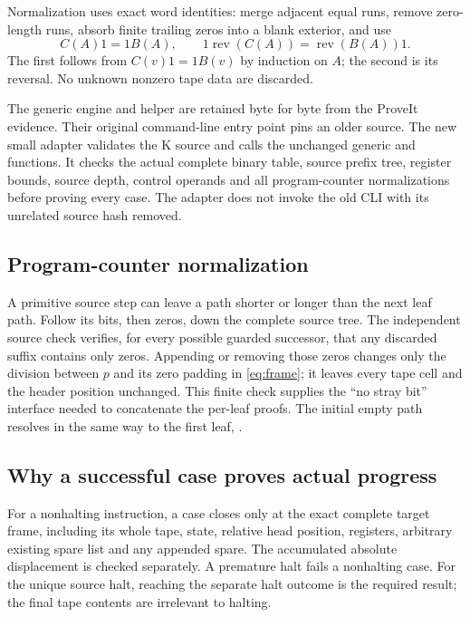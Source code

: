 \documentclass[11pt,a4paper]{article}
\newcommand{\code}[1]{\texttt{\detokenize{#1}}}
\begin{document}
Normalization uses exact word identities: merge adjacent equal runs,
remove zero-length runs, absorb finite trailing zeros into a blank
exterior, and use
\[
 C(A)1=1B(A),\qquad
 1\operatorname{rev}(C(A))=\operatorname{rev}(B(A))1.
\]
The first follows from $C(v)1=1B(v)$ by induction on $A$; the second
is its reversal. No unknown nonzero tape data are discarded.

The generic engine and helper are retained byte for byte from the
ProveIt evidence. Their original command-line entry point pins an older
source. The new small adapter validates the K source and calls the
unchanged generic \code{prove_blocks} and \code{case} functions.
It checks the actual complete binary table, source prefix tree,
register bounds, source depth, control operands and all program-counter
normalizations before proving every case. The adapter does not invoke
the old CLI with its unrelated source hash removed.

\subsection{Program-counter normalization}

A primitive source step can leave a path shorter or longer than the
next leaf path. Follow its bits, then zeros, down the complete source
tree. The independent source check verifies, for every possible
guarded successor, that any discarded suffix contains only zeros.
Appending or removing those zeros changes only the division between
$p$ and its zero padding in \eqref{eq:frame}; it leaves every tape cell
and the header position unchanged. This finite check supplies the
``no stray bit'' interface needed to concatenate the per-leaf proofs.
The initial empty path resolves in the same way to the first leaf,
\code{000}.

\subsection{Why a successful case proves actual progress}

For a nonhalting instruction, a case closes only at the exact complete
target frame, including its whole tape, state, relative head position,
registers, arbitrary existing spare list and any appended spare.
The accumulated absolute displacement is checked separately. A
premature halt fails a nonhalting case. For the unique source halt,
reaching the separate halt outcome is the required result; the final
tape contents are irrelevant to halting.
\end{document}
